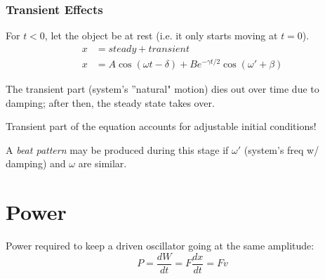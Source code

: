 \subsubsection{Transient Effects}
For $t<0$, let the object be at rest (i.e. it only starts moving at $t=0$).
\begin{align*}
x &= steady + transient \\
x &= A \cos (\omega t - \delta) + B e^{-\gamma t/2} \cos(\omega' + \beta)
\end{align*}

The transient part (system's ''natural" motion) dies out over time due to damping; after then, the steady state takes over. 

Transient part of the equation accounts for adjustable initial conditions!

A \emph{beat pattern} may be produced during this stage if $\omega'$ (system's freq w/ damping) and $\omega$ are similar.

\section{Power}
Power required to keep a driven oscillator going at the same amplitude:
\[ P = \frac{dW}{dt} = F\frac{dx}{dt} = Fv \]